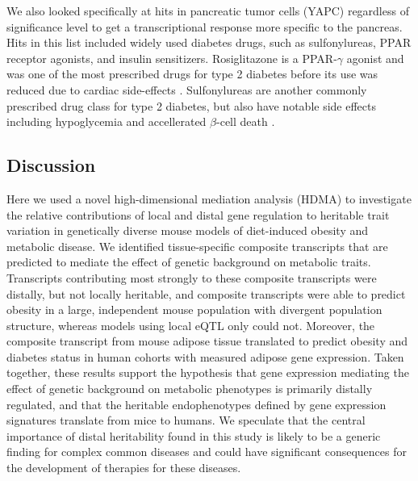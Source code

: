 \documentclass[
]{article}
\begin{document}
We also looked specifically at hits in pancreatic tumor cells (YAPC)
regardless of significance level to get a transcriptional response more
specific to the pancreas. Hits in this list included widely used
diabetes drugs, such as sulfonylureas, PPAR receptor agonists, and
insulin sensitizers. Rosiglitazone is a PPAR-\(\gamma\) agonist and was
one of the most prescribed drugs for type 2 diabetes before its use was
reduced due to cardiac side-effects \cite{pmid21190462}. Sulfonylureas
are another commonly prescribed drug class for type 2 diabetes, but also
have notable side effects including hypoglycemia and accellerated
\(\beta\)-cell death \cite{pmid16631807}.

\subsection{Discussion}\label{discussion}

Here we used a novel high-dimensional mediation analysis (HDMA) to
investigate the relative contributions of local and distal gene
regulation to heritable trait variation in genetically diverse mouse
models of diet-induced obesity and metabolic disease. We identified
tissue-specific composite transcripts that are predicted to mediate the
effect of genetic background on metabolic traits. Transcripts
contributing most strongly to these composite transcripts were distally,
but not locally heritable, and composite transcripts were able to
predict obesity in a large, independent mouse population with divergent
population structure, whereas models using local eQTL only could not.
Moreover, the composite transcript from mouse adipose tissue translated
to predict obesity and diabetes status in human cohorts with measured
adipose gene expression. Taken together, these results support the
hypothesis that gene expression mediating the effect of genetic
background on metabolic phenotypes is primarily distally regulated, and
that the heritable endophenotypes defined by gene expression signatures
translate from mice to humans. We speculate that the central importance
of distal heritability found in this study is likely to be a generic
finding for complex common diseases and could have significant
consequences for the development of therapies for these diseases.
\end{document}
